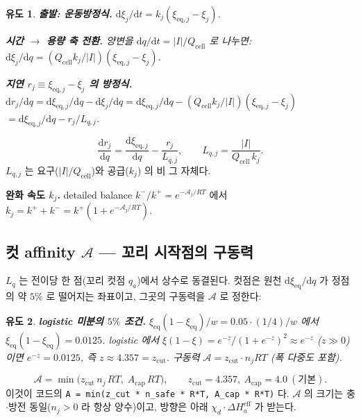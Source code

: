 \documentclass[11pt,a4paper]{article}
\newtheorem*{derivebox}{유도}
\newcommand{\dd}{\mathrm{d}}
\newcommand{\eff}{\mathrm{eff}}
\newcommand{\eq}{\mathrm{eq}}
\newcommand{\cell}{\mathrm{cell}}
\newcommand{\code}[1]{\texttt{#1}}
\begin{document}
\begin{derivebox}
\textbf{출발: 운동방정식.} $\dd\xi_j/\dd t=k_j(\xi_{\eq,j}-\xi_j)$.

\textbf{시간 $\to$ 용량 축 전환.} 양변을 $\dd q/\dd t=|I|/Q_\cell$ 로 나누면:
$\dd\xi_j/\dd q=(Q_\cell k_j/|I|)(\xi_{\eq,j}-\xi_j)$.

\textbf{지연 $r_j\equiv\xi_{\eq,j}-\xi_j$ 의 방정식.}
$\dd r_j/\dd q=\dd\xi_{\eq,j}/\dd q-\dd\xi_j/\dd q=\dd\xi_{\eq,j}/\dd q-(Q_\cell k_j/|I|)(\xi_{\eq,j}-\xi_j)$
$=\dd\xi_{\eq,j}/\dd q-r_j/L_{q,j}$.
\end{derivebox}

\begin{equation}
\frac{\dd r_j}{\dd q}=\frac{\dd\xi_{\eq,j}}{\dd q}-\frac{r_j}{L_{q,j}},
\qquad L_{q,j}=\frac{|I|}{Q_\cell\,k_j}.
\label{eq:Lq}
\end{equation}
$L_{q,j}$ 는 요구($|I|/Q_\cell$)와 공급($k_j$) 의 비 그 자체다.

\textbf{완화 속도 $k_j$.} detailed balance $k^-/k^+=e^{-\mathcal A_j/RT}$ 에서 $k_j=k^++k^-=k^+(1+e^{-\mathcal A_j/RT})$.

\subsection{컷 affinity $\mathcal A$ — 꼬리 시작점의 구동력}
$L_q$ 는 전이당 한 점(꼬리 컷점 $q_a$)에서 상수로 동결된다. 컷점은 원천 $\dd\xi_\eq/\dd q$ 가 정점의
약 $5\%$ 로 떨어지는 좌표이고, 그곳의 구동력을 $\mathcal A$ 로 정한다:

\begin{derivebox}
\textbf{logistic 미분의 $5\%$ 조건.} $\xi_\eq(1-\xi_\eq)/w=0.05\cdot(1/4)/w$ 에서 $\xi_\eq(1-\xi_\eq)=0.0125$.
logistic 에서 $\xi(1-\xi)=e^{-z}/(1+e^{-z})^2\approx e^{-z}$ ($z\gg0$) 이면 $e^{-z}=0.0125$, 즉 $z\approx4.357=z_\mathrm{cut}$.
구동력 $\mathcal A=z_\mathrm{cut}\cdot n_jRT$ (폭 다중도 포함).
\end{derivebox}

\begin{equation}
\mathcal A=\min\!\big(z_\mathrm{cut}\,n_j\,RT,\;A_\mathrm{cap}\,RT\big),
\qquad z_\mathrm{cut}=4.357,\ A_\mathrm{cap}=4.0\ (\text{기본}).
\label{eq:Acut}
\end{equation}
이것이 코드의 \code{A = min(z\_cut * n\_safe * R*T, A\_cap * R*T)} 다. $\mathcal A$ 의 크기는 충$\cdot$방전
동일($n_j>0$ 라 항상 양수)이고, 방향은 아래 $\chi_d\cdot\Delta H_a^\eff$ 가 받는다.
\end{document}
